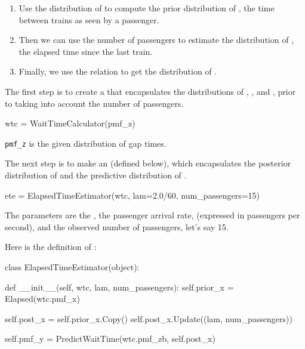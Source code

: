 \documentclass[12pt]{book}
\theoremstyle{exercise}
\begin{document}
\begin{enumerate}

\item Use the distribution of  to compute
the prior distribution of , the time between trains
as seen by a passenger.

\item Then we can use the number of passengers to estimate the distribution
of , the elapsed time since the last train.

\item Finally, we use the relation  to get the
distribution of .

\end{enumerate}

The first step is to create a  that
encapsulates the distributions of , ,
and , prior to taking into account the number of
passengers.

\begin{code}
    wtc = WaitTimeCalculator(pmf_z)
\end{code}

\verb"pmf_z" is the given distribution of gap times.

The next step is to make an  (defined
below), which encapsulates the posterior distribution of  and
the predictive distribution of .

\begin{code}
    ete = ElapsedTimeEstimator(wtc,
                               lam=2.0/60,
                               num_passengers=15)
\end{code}

The parameters are the , the passenger
arrival rate,  (expressed in passengers per second),
and the observed number of passengers, let's say 15.

Here is the definition of :

\begin{code}
class ElapsedTimeEstimator(object):

    def __init__(self, wtc, lam, num_passengers):
        self.prior_x = Elapsed(wtc.pmf_x)

        self.post_x = self.prior_x.Copy()
        self.post_x.Update((lam, num_passengers))

        self.pmf_y = PredictWaitTime(wtc.pmf_zb, self.post_x)
\end{code}
\end{document}
